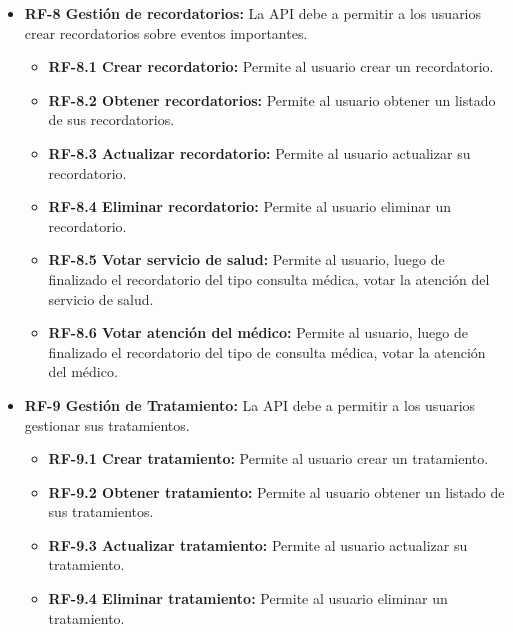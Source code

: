 \begin{itemize}
\tightlist
\item
  \textbf{RF-8 Gestión de recordatorios:} La API debe a permitir a los usuarios crear recordatorios sobre eventos importantes.\\
  \begin{itemize}
  \tightlist
  \item
    \textbf{RF-8.1 Crear recordatorio:} Permite al usuario crear un recordatorio.\\
  \item
    \textbf{RF-8.2 Obtener recordatorios:} Permite al usuario obtener un listado de sus recordatorios.\\
  \item
    \textbf{RF-8.3 Actualizar recordatorio:} Permite al usuario actualizar su recordatorio.\\
  \item
    \textbf{RF-8.4 Eliminar recordatorio:} Permite al usuario eliminar un recordatorio.\\
  \item
    \textbf{RF-8.5 Votar servicio de salud:} Permite al usuario, luego de finalizado el recordatorio del tipo consulta médica, votar la atención del servicio de salud.\\
  \item
    \textbf{RF-8.6 Votar atención del médico:} Permite al usuario, luego de finalizado el recordatorio del tipo de consulta médica, votar la atención del médico.\\
\end{itemize}    
\end{itemize}

\begin{itemize}
\tightlist
\item
  \textbf{RF-9 Gestión de Tratamiento:} La API debe a permitir a los usuarios gestionar sus tratamientos.\\
  \begin{itemize}
  \tightlist
  \item
    \textbf{RF-9.1 Crear tratamiento:} Permite al usuario crear un tratamiento.\\
 \item
    \textbf{RF-9.2 Obtener tratamiento:} Permite al usuario obtener un listado de sus tratamientos.\\
  \item
    \textbf{RF-9.3 Actualizar tratamiento:} Permite al usuario actualizar su tratamiento.\\
 \item
    \textbf{RF-9.4 Eliminar tratamiento:} Permite al usuario eliminar un tratamiento.\\
\end{itemize}    
\end{itemize}


